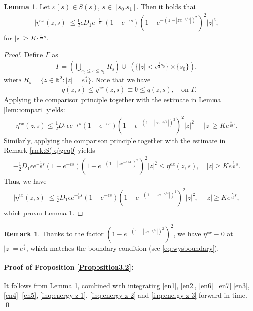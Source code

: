 \documentclass[11pt,reqno]{amsart}
\theoremstyle{definition}
\theoremstyle{bfremark}
\newtheorem{remark}{Remark}[section]
\newtheorem{lemma}{Lemma}[section]
\numberwithin{equation}{section}
\begin{document}
\begin{lemma}
\label{Lemma5.10}
Let \(\varepsilon(s) \in S(s)\), \(s \in [s_0.s_1]\). Then it holds that
    \begin{align}
        |\eta^{ex}(z,s)| \leq  \frac{1}{2}\epsilon D_1 e^{-\frac{1}{6}s}(1-e^{-\epsilon s})\left(1-e^{-(1-|ze^{-s/4}|)^2}\right)^2|z|^2, \label{max1}
    \end{align}
    for \(|z| \geq Ke^{\frac{5}{49}s}\).
\end{lemma}
\begin{proof}
    Define \(\Gamma\) as
\begin{align*}
        \Gamma=\left(\bigcup_{s_0 \leq s \leq s_1} R_s\right) \cup \: \left(\{|z|<e^{\frac{1}{4}s_0}\} \times \{s_0\}\right),
\end{align*}
where \(R_s=\{z\in\mathbb{R}^2:|z|=e^{\frac{s}{4}}\}\). Note that we have
    \begin{align}
         -q(z,s)\leq\eta^{ex}(z,s) \equiv 0 \leq q(z,s), \quad \text{on } \Gamma.
    \end{align}
    Applying the comparison principle together with the estimate in Lemma \ref{lem:compari} yields:
    \begin{align*}
        \eta^{ex}(z,s) \leq \frac{1}{2}D_1\epsilon e^{-\frac{1}{6}s}(1-e^{-\epsilon s})\left(1-e^{-(1-|ze^{-s/4}|)^2}\right)^2|z|^2, \quad |z| \geq Ke^{\frac{5}{49}s}.
    \end{align*}
Similarly, applying the comparison principle together with the estimate in Remark \ref{rmk:S(-q)geq0} yields
\begin{align*}
   -\frac{1}{2}D_1\epsilon e^{-\frac{1}{6}s}(1-e^{-\epsilon s})\left(1-e^{-(1-|ze^{-s/4}|)^2}\right)^2|z|^2 \leq \eta^{ex}(z,s), \quad |z| \geq Ke^{\frac{5}{49}s}.
\end{align*}
Thus, we have
\begin{align}
        |\eta^{ex}(z,s)| \leq \frac{1}{2}D_1\epsilon e^{-\frac{1}{6}s}(1-e^{-\epsilon s})\left(1-e^{-(1-|ze^{-s/4}|)^2}\right)^2|z|^2, \quad |z| \geq Ke^{\frac{5}{49}s},
\end{align}
which proves Lemma \ref{Lemma5.10}.
\end{proof}
\begin{remark}
    Thanks to the factor \((1-e^{-(1-|ze^{-s/4}|)^2})^2\), we have \(\eta^{ex} \equiv 0\) at \(|z|=e^{\frac{s}{4}}\), which matches the boundary condition (see \ref{eq:wysboundary}).
\end{remark}


\paragraph{\textbf{Proof of Proposition \ref{Proposition3.2}:}} It follows from Lemma \ref{Lemma5.10}, combined with integrating
\ref{en1}, \ref{en2}, \ref{en6}, \ref{en7} \ref{en3}, \ref{en4}, \ref{en5}, \ref{inq:energy z 1}, \ref{inq:energy z 2} and \ref{inq:energy z 3} forward in time. \qed
\end{document}
